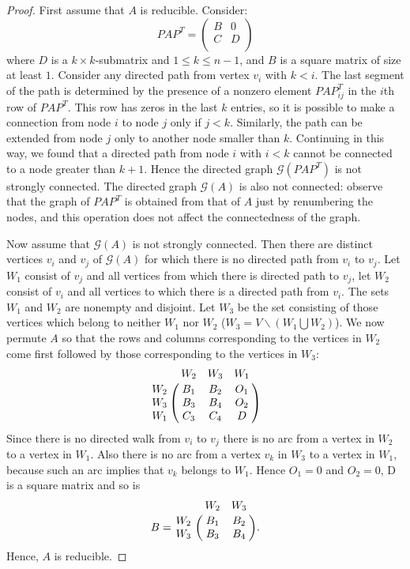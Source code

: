 \documentclass[a4paper,11pt]{report}
\newcommand{\graf}{\mathscr{G}}
\begin{document}
\begin{proof}
  First assume that $A$ is reducible. Consider:
   $$ PAP^T = \begin{pmatrix}  B  & 0\\
 C  & D\\
\end{pmatrix} $$
where $D$ is a $k \times k$-submatrix and $1 \leq k \leq n-1$, and $B$ is a square matrix of size at least $1$. 
Consider any directed path from vertex $v_i$ with $k < i$. The last segment of the path is determined by the presence of a 
nonzero element $PAP^T_{ij}$ in the $i$th row of $ PAP^T$. This row has zeros in the last 
$k$ entries, so it is possible to make a connection from node $i$ to node $j$ 
only if $j < k$. Similarly, the path can be extended from node $j$ only to 
another node smaller than $k$. Continuing in this way, we found that a 
directed path from node $i$ with $i < k$ cannot be connected to a node greater than $k +1$. Hence the
directed graph $\graf(PAP^T)$ is not strongly connected. The directed graph $\graf(A)$ 
is also not connected: observe that the graph of  $PAP^T$ is obtained from that of $A$ just by renumbering the nodes, and
this operation does not affect the connectedness of the graph. 

Now assume that $\graf(A)$ is not strongly connected. Then there are distinct vertices $v_i$ and 
$v_j$ of $\graf(A)$ for which there is no directed path from $v_i$ to $v_j$. Let $W_1$ consist of
$v_j$ and all vertices from which there is directed path to $v_j$, let $W_2$ consist of $v_i$ and
all vertices to which there is a directed path from $v_i$. The sets $W_1$ and $W_2$ 
are nonempty and disjoint. Let $W_3$ be the set consisting of those vertices 
which belong to neither $W_1$ nor $W_2$ ($W_3 = V\backslash(W_1 \bigcup W_2)$). 
We now permute $A$ so that the rows and columns corresponding to the 
vertices in $W_2$ come first followed by those corresponding to the vertices in 
$W_3$:
$$\bordermatrix{\; &W_2&W_3&W_1\cr
                W_2&B_1 &  B_2  & O_{1}\cr
                W_3&B_3 &  B_4  & O_{2}\cr
                W_1&C_3 &  C_4 & D}$$
Since there is no directed walk from $v_i$ to $v_j$ there is no arc
from a vertex in $W_2$ to a vertex in $W_1$. Also there is no arc from
a vertex $v_k$ in $W_3$ to a vertex in $W_1$, because such an arc implies that $v_k$ 
belongs to $W_1$. Hence $O_{1} = 0$ and $O_{2} = 0$, D is a square matrix
and so is
$$B = \bordermatrix{\; &W_2&W_3\cr
                W_2&B_1 &  B_2\cr
                W_3&B_3 &  B_4}.$$
                Hence,   $A$ is reducible.
\end{proof}
\end{document}
